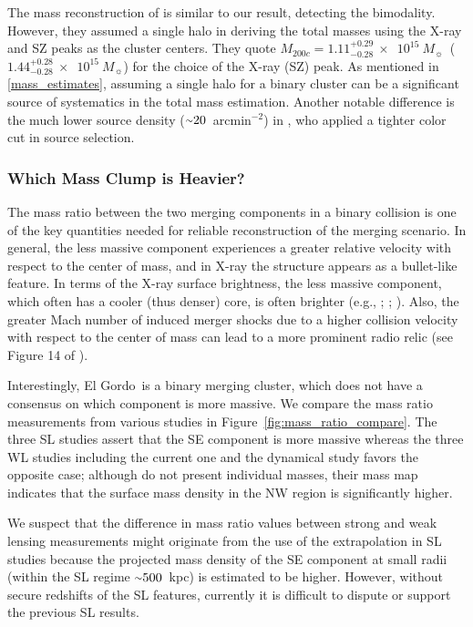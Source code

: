 \documentclass[twocolumn]{aastex631}
\newcommand{\elgordo}{El Gordo}
\newcommand{\mytilde}{\raise.19ex\hbox{$\scriptstyle\sim$}}
\newcommand{\solarmA}{$10^{15}~M_{\sun}$}
\newcommand{\persqarcmin}{arcmin$^{-2}$}
\begin{document}
The mass reconstruction of \cite{Schrabback2018} is similar to our result, detecting the bimodality. 
However, they assumed a single halo in deriving the total masses using the X-ray and SZ peaks as the cluster centers. They quote $M_{200c} = 1.11^{+0.29}_{-0.28}~\times$~\solarmA~($1.44^{+0.28}_{-0.28}~\times$~\solarmA) for the choice of the X-ray (SZ) peak. 
As mentioned in \textsection\ref{mass_estimates}, assuming a single halo for a binary cluster can be a significant source of systematics in the total mass estimation. 
Another notable difference is the much lower source density ($\mytilde20$~\persqarcmin) in \cite{Schrabback2018}, who applied a tighter color cut in source selection. \\


\subsubsection{Which Mass Clump is Heavier?} \label{mass_ratio_inconsistency}
The mass ratio between the two merging components in a binary collision is one of the key quantities needed for reliable reconstruction of the merging scenario. 
In general, the less massive component experiences a greater relative velocity with respect to the center of mass, and in X-ray the structure appears as a bullet-like feature. In terms of the X-ray surface brightness, the less massive component, which often has a cooler (thus denser) core, is often brighter (e.g., \citealt{Clowe2006}; \citealt{Jee2016}; \citealt{Golovich2017}). 
Also, the greater Mach number of induced merger shocks due to a higher collision velocity with respect to the center of mass can lead to a more prominent radio relic (see Figure 14 of \citealt{vanWeeren2019}).


Interestingly, \elgordo~is a binary merging cluster, which does not have a consensus on which component is more massive. We compare the mass ratio measurements from various studies in Figure~\ref{fig:mass_ratio_compare}. 
The three SL studies assert that the SE component is more massive whereas the three WL studies including the current one and the dynamical study favors the opposite case; although \cite{Schrabback2018} do not present individual masses, their mass map indicates that the surface mass density in the NW region is significantly higher.


We suspect that the difference in mass ratio values between strong and weak lensing measurements might originate from the use of the extrapolation in SL studies because the projected mass density of the SE component at small radii (within the SL regime $\mytilde500$~kpc) is estimated to be higher. 
However, without secure redshifts of the SL features, currently it is difficult to dispute or support the previous SL results.
\end{document}
